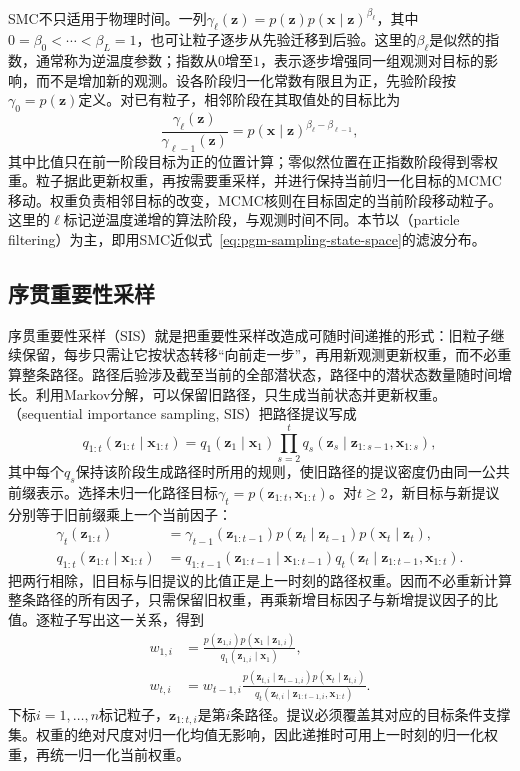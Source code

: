 SMC不只适用于物理时间。一列$\gamma_\ell(\bm{z})=p(\bm{z})p(\bm{x}\mid\bm{z})^{\beta_\ell}$，其中$0=\beta_0<\cdots<\beta_L=1$，也可让粒子逐步从先验迁移到后验。这里的$\beta_\ell$是似然的指数，通常称为逆温度参数；指数从$0$增至$1$，表示逐步增强同一组观测对目标的影响，而不是增加新的观测。设各阶段归一化常数有限且为正，先验阶段按$\gamma_0=p(\bm z)$定义。对已有粒子，相邻阶段在其取值处的目标比为
\[
  \frac{\gamma_\ell(\bm z)}{\gamma_{\ell-1}(\bm z)}
    =p(\bm x\mid\bm z)^{\beta_\ell-\beta_{\ell-1}},
\]
其中比值只在前一阶段目标为正的位置计算；零似然位置在正指数阶段得到零权重。粒子据此更新权重，再按需要重采样，并进行保持当前归一化目标的MCMC移动。权重负责相邻目标的改变，MCMC核则在目标固定的当前阶段移动粒子。这里的$\ell$标记逆温度递增的算法阶段，与观测时间不同。本节以（particle filtering）为主，即用SMC近似式~\eqref{eq:pgm-sampling-state-space}的滤波分布。

\subsection{序贯重要性采样}
\label{sec:pgm-sampling-sis}

序贯重要性采样（SIS）就是把重要性采样改造成可随时间递推的形式：旧粒子继续保留，每步只需让它按状态转移“向前走一步”，再用新观测更新权重，而不必重算整条路径。路径后验涉及截至当前的全部潜状态，路径中的潜状态数量随时间增长。利用Markov分解，可以保留旧路径，只生成当前状态并更新权重。（sequential importance sampling, SIS）把路径提议写成
\[
  q_{1:t}(\bm{z}_{1:t}\mid\bm{x}_{1:t})
    =q_1(\bm{z}_1\mid\bm{x}_1)
      \prod_{s=2}^{t}
        q_s(\bm{z}_s\mid\bm{z}_{1:s-1},\bm{x}_{1:s}),
\]
其中每个$q_s$保持该阶段生成路径时所用的规则，使旧路径的提议密度仍由同一公共前缀表示。选择未归一化路径目标$\gamma_t=p(\bm{z}_{1:t},\bm{x}_{1:t})$。对$t\geq2$，新目标与新提议分别等于旧前缀乘上一个当前因子：
\[
  \begin{aligned}
    \gamma_t(\bm z_{1:t})
      &=\gamma_{t-1}(\bm z_{1:t-1})
          p(\bm z_t\mid\bm z_{t-1})p(\bm x_t\mid\bm z_t),\\
    q_{1:t}(\bm z_{1:t}\mid\bm x_{1:t})
      &=q_{1:t-1}(\bm z_{1:t-1}\mid\bm x_{1:t-1})
          q_t(\bm z_t\mid\bm z_{1:t-1},\bm x_{1:t}).
  \end{aligned}
\]
把两行相除，旧目标与旧提议的比值正是上一时刻的路径权重。因而不必重新计算整条路径的所有因子，只需保留旧权重，再乘新增目标因子与新增提议因子的比值。逐粒子写出这一关系，得到
\begin{equation}
  \begin{aligned}
    w_{1,i}&=
      \frac{p(\bm{z}_{1,i})p(\bm{x}_1\mid\bm{z}_{1,i})}
           {q_1(\bm{z}_{1,i}\mid\bm{x}_1)},\\
    w_{t,i}&=w_{t-1,i}
      \frac{p(\bm{z}_{t,i}\mid\bm{z}_{t-1,i})
            p(\bm{x}_t\mid\bm{z}_{t,i})}
           {q_t(\bm{z}_{t,i}\mid\bm{z}_{1:t-1,i},\bm{x}_{1:t})}.
  \end{aligned}
  \label{eq:pgm-sampling-sis-weight}
\end{equation}
下标$i=1,\ldots,n$标记粒子，$\bm{z}_{1:t,i}$是第$i$条路径。提议必须覆盖其对应的目标条件支撑集。权重的绝对尺度对归一化均值无影响，因此递推时可用上一时刻的归一化权重，再统一归一化当前权重。

